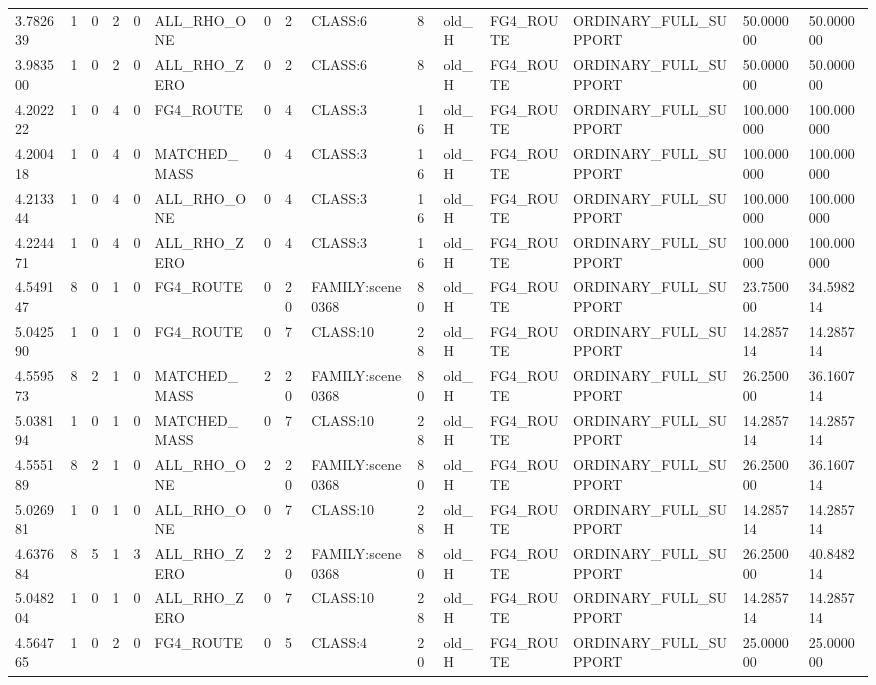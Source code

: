 \begin{tabular}{lllllllllllllll}
3.782639 & 1 & 0 & 2 & 0 & ALL\_RHO\_ONE & 0 & 2 & CLASS:6 & 8 & old\_H & FG4\_ROUTE & ORDINARY\_FULL\_SUPPORT & 50.000000 & 50.000000 \\
3.983500 & 1 & 0 & 2 & 0 & ALL\_RHO\_ZERO & 0 & 2 & CLASS:6 & 8 & old\_H & FG4\_ROUTE & ORDINARY\_FULL\_SUPPORT & 50.000000 & 50.000000 \\
4.202222 & 1 & 0 & 4 & 0 & FG4\_ROUTE & 0 & 4 & CLASS:3 & 16 & old\_H & FG4\_ROUTE & ORDINARY\_FULL\_SUPPORT & 100.000000 & 100.000000 \\
4.200418 & 1 & 0 & 4 & 0 & MATCHED\_MASS & 0 & 4 & CLASS:3 & 16 & old\_H & FG4\_ROUTE & ORDINARY\_FULL\_SUPPORT & 100.000000 & 100.000000 \\
4.213344 & 1 & 0 & 4 & 0 & ALL\_RHO\_ONE & 0 & 4 & CLASS:3 & 16 & old\_H & FG4\_ROUTE & ORDINARY\_FULL\_SUPPORT & 100.000000 & 100.000000 \\
4.224471 & 1 & 0 & 4 & 0 & ALL\_RHO\_ZERO & 0 & 4 & CLASS:3 & 16 & old\_H & FG4\_ROUTE & ORDINARY\_FULL\_SUPPORT & 100.000000 & 100.000000 \\
4.549147 & 8 & 0 & 1 & 0 & FG4\_ROUTE & 0 & 20 & FAMILY:scene0368 & 80 & old\_H & FG4\_ROUTE & ORDINARY\_FULL\_SUPPORT & 23.750000 & 34.598214 \\
5.042590 & 1 & 0 & 1 & 0 & FG4\_ROUTE & 0 & 7 & CLASS:10 & 28 & old\_H & FG4\_ROUTE & ORDINARY\_FULL\_SUPPORT & 14.285714 & 14.285714 \\
4.559573 & 8 & 2 & 1 & 0 & MATCHED\_MASS & 2 & 20 & FAMILY:scene0368 & 80 & old\_H & FG4\_ROUTE & ORDINARY\_FULL\_SUPPORT & 26.250000 & 36.160714 \\
5.038194 & 1 & 0 & 1 & 0 & MATCHED\_MASS & 0 & 7 & CLASS:10 & 28 & old\_H & FG4\_ROUTE & ORDINARY\_FULL\_SUPPORT & 14.285714 & 14.285714 \\
4.555189 & 8 & 2 & 1 & 0 & ALL\_RHO\_ONE & 2 & 20 & FAMILY:scene0368 & 80 & old\_H & FG4\_ROUTE & ORDINARY\_FULL\_SUPPORT & 26.250000 & 36.160714 \\
5.026981 & 1 & 0 & 1 & 0 & ALL\_RHO\_ONE & 0 & 7 & CLASS:10 & 28 & old\_H & FG4\_ROUTE & ORDINARY\_FULL\_SUPPORT & 14.285714 & 14.285714 \\
4.637684 & 8 & 5 & 1 & 3 & ALL\_RHO\_ZERO & 2 & 20 & FAMILY:scene0368 & 80 & old\_H & FG4\_ROUTE & ORDINARY\_FULL\_SUPPORT & 26.250000 & 40.848214 \\
5.048204 & 1 & 0 & 1 & 0 & ALL\_RHO\_ZERO & 0 & 7 & CLASS:10 & 28 & old\_H & FG4\_ROUTE & ORDINARY\_FULL\_SUPPORT & 14.285714 & 14.285714 \\
4.564765 & 1 & 0 & 2 & 0 & FG4\_ROUTE & 0 & 5 & CLASS:4 & 20 & old\_H & FG4\_ROUTE & ORDINARY\_FULL\_SUPPORT & 25.000000 & 25.000000 \\

\end{tabular}

